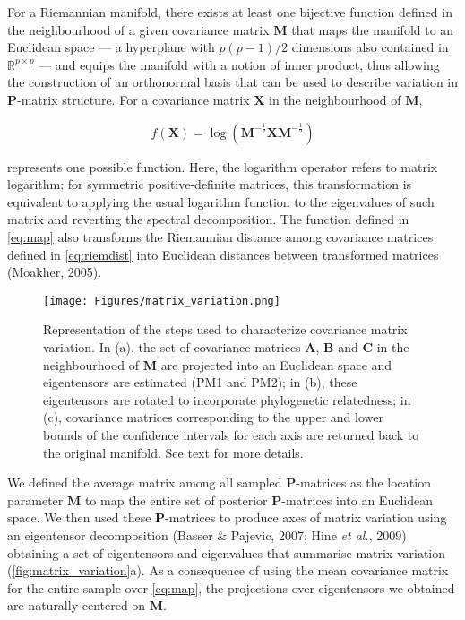 \documentclass[12pt,twoside]{report}
\begin{document}
For a Riemannian manifold, there exists at least one bijective function
defined in the neighbourhood of a given covariance matrix $\mathbf{M}$
that maps the manifold to an Euclidean space --- a hyperplane with
$p (p - 1) / 2$ dimensions also contained in $\mathbb{R}^{p \times p}$
--- and equips the manifold with a notion of inner product, thus
allowing the construction of an orthonormal basis that can be used to
describe variation in $\mathbf{P}$-matrix structure. For a covariance
matrix $\mathbf{X}$ in the neighbourhood of $\mathbf{M}$,

\begin{equation}
f(\mathbf{X}) = \log (\mathbf{M}^{- \frac{1}{2}} \mathbf{X} \mathbf{M}^{- \frac{1}{2}})
\label{eq:map}
\end{equation}

represents one possible function. Here, the logarithm operator refers to
matrix logarithm; for symmetric positive-definite matrices, this
transformation is equivalent to applying the usual logarithm function to
the eigenvalues of such matrix and reverting the spectral decomposition.
The function defined in \autoref{eq:map} also transforms the Riemannian
distance among covariance matrices defined in \autoref{eq:riemdist} into
Euclidean distances between transformed matrices (Moakher, 2005).

\begin{figure}[htbp]
\centering
\texttt{[image: Figures/matrix\_variation.png]}
\caption{Representation of the steps used to characterize covariance
matrix variation. In (a), the set of covariance matrices $\mathbf{A}$,
$\mathbf{B}$ and $\mathbf{C}$ in the neighbourhood of $\mathbf{M}$ are
projected into an Euclidean space and eigentensors are estimated (PM1
and PM2); in (b), these eigentensors are rotated to incorporate
phylogenetic relatedness; in (c), covariance matrices corresponding to
the upper and lower bounds of the confidence intervals for each axis are
returned back to the original manifold. See text for more details.
\label{fig:matrix_variation}}
\end{figure}

We defined the average matrix among all sampled $\mathbf{P}$-matrices as
the location parameter $\mathbf{M}$ to map the entire set of posterior
$\mathbf{P}$-matrices into an Euclidean space. We then used these
$\mathbf{P}$-matrices to produce axes of matrix variation using an
eigentensor decomposition (Basser \& Pajevic, 2007; Hine \emph{et al.},
2009) obtaining a set of eigentensors and eigenvalues that summarise
matrix variation (\autoref{fig:matrix_variation}a). As a consequence of
using the mean covariance matrix for the entire sample over
\autoref{eq:map}, the projections over eigentensors we obtained are
naturally centered on $\mathbf{M}$.
\end{document}
